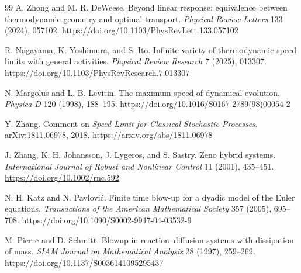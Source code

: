 \documentclass[11pt,a4paper]{article}
\theoremstyle{definition}
\numberwithin{equation}{section}
\begin{document}
\begin{thebibliography}{99}
A. Zhong and M. R. DeWeese.
Beyond linear response: equivalence between thermodynamic geometry and
optimal transport.
\emph{Physical Review Letters}
133 (2024), 057102.
\url{https://doi.org/10.1103/PhysRevLett.133.057102}

R. Nagayama, K. Yoshimura, and S. Ito.
Infinite variety of thermodynamic speed limits with general activities.
\emph{Physical Review Research}
7 (2025), 013307.
\url{https://doi.org/10.1103/PhysRevResearch.7.013307}

N. Margolus and L. B. Levitin.
The maximum speed of dynamical evolution.
\emph{Physica D}
120 (1998), 188--195.
\url{https://doi.org/10.1016/S0167-2789(98)00054-2}

Y. Zhang.
Comment on \emph{Speed Limit for Classical Stochastic Processes}.
arXiv:1811.06978, 2018.
\url{https://arxiv.org/abs/1811.06978}

J. Zhang, K. H. Johansson, J. Lygeros, and S. Sastry.
Zeno hybrid systems.
\emph{International Journal of Robust and Nonlinear Control}
11 (2001), 435--451.
\url{https://doi.org/10.1002/rnc.592}

N. H. Katz and N. Pavlovi\'c.
Finite time blow-up for a dyadic model of the Euler equations.
\emph{Transactions of the American Mathematical Society}
357 (2005), 695--708.
\url{https://doi.org/10.1090/S0002-9947-04-03532-9}

M. Pierre and D. Schmitt.
Blowup in reaction--diffusion systems with dissipation of mass.
\emph{SIAM Journal on Mathematical Analysis}
28 (1997), 259--269.
\url{https://doi.org/10.1137/S0036141095295437}

\end{thebibliography}


\end{document}
